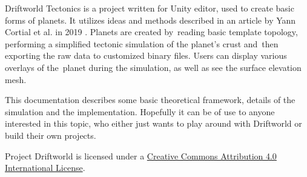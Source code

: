 Driftworld Tectonics is a project written for Unity editor, used to create basic forms of planets. It utilizes ideas and methods described in an article by Yann Cortial et al. in 2019 \cite{cortial}. Planets are created by~reading basic template topology, performing a simplified tectonic simulation of the planet's crust and~then exporting the raw data to customized binary files. Users can display various overlays of the~planet during the simulation, as well as see the surface elevation mesh.\par
This documentation describes some basic theoretical framework, details of the simulation and the implementation. Hopefully it can be of use to anyone interested in this topic, who either just wants to play around with Driftworld or build their own projects.\par
Project Driftworld is licensed under a \href{https://creativecommons.org/licenses/by/4.0/}{Creative Commons Attribution 4.0 International License}.